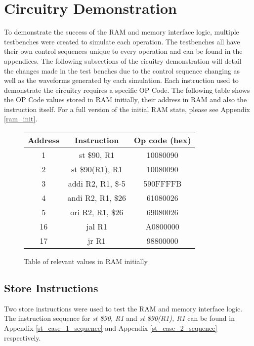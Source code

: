 \documentclass{article}
\begin{document}
\section{Circuitry Demonstration}
    To demonstrate the success of the RAM and memory interface logic, multiple testbenches were created to simulate each operation. 
    The testbenches all have their own control sequences unique to every operation and can be found in the appendices. The following subsections 
    of the cicuitry demonstration will detail the changes made in the test benches due to the control sequence changing as well as the waveforms generated by each simulation.
    Each instruction used to demonstrate the circuitry requires a specific OP Code. The following table shows the OP Code values stored in RAM initially, their address in RAM and also the instruction itself. For a full version of the initial RAM state, please see Appendix \ref{ram_init}.
    \begin{figure}[h!] \label{relevant_ram_init}
        \begin{center}
            \begin{tabular}{|c|c|c|}
                \hline
                Address & Instruction & Op code (hex) \\
                \hline
                1 & st \$90, R1 & 10080090 \\
                \hline
                2 & st \$90(R1), R1 & 10080090 \\
                \hline
                3 & addi R2, R1, \$-5 & 590FFFFB \\
                \hline
                4 & andi R2, R1, \$26 & 61080026 \\
                \hline
                5 & ori R2, R1, \$26 & 69080026 \\
                \hline
                16 & jal R1 & A0800000 \\
                \hline
                17 & jr R1 & 98800000 \\
                \hline
            \end{tabular}
            \caption{Table of relevant values in RAM initially}
        \end{center}
    \end{figure}
        \subsection{Store Instructions}
            Two store instructions were used to test the RAM and memory interface logic. The instruction sequence for \emph{st \$90, R1} and \emph{st \$90(R1), R1} can be found in Appendix \ref{st_case_1_sequence} and Appendix \ref{st_case_2_sequence} respectively.
            
\end{document}
